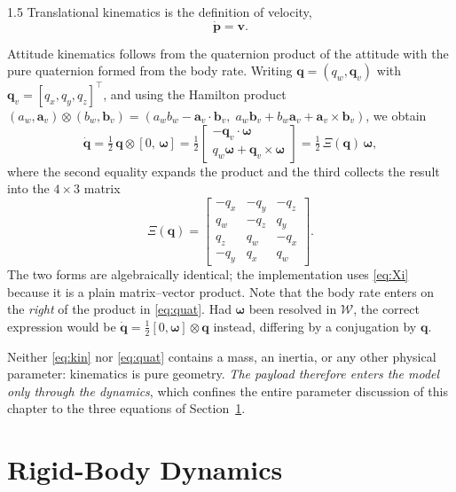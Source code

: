 \begin{spacing}{1.5}
Translational kinematics is the definition of velocity,
\begin{equation}
\dot{\bm{p}} = \bm{v}.
\label{eq:kin}
\end{equation}

Attitude kinematics follows from the quaternion product of the attitude
with the pure quaternion formed from the body rate. Writing
$\bm{q} = (q_w, \bm{q}_v)$ with $\bm{q}_v = [q_x, q_y, q_z]^{\!\top}$,
and using the Hamilton product
$(a_w, \bm{a}_v) \otimes (b_w, \bm{b}_v) =
(a_w b_w - \bm{a}_v \!\cdot\! \bm{b}_v,\;
a_w \bm{b}_v + b_w \bm{a}_v + \bm{a}_v \!\times\! \bm{b}_v)$,
we obtain
\begin{equation}
\dot{\bm{q}} = \tfrac{1}{2}\, \bm{q} \otimes [0,\, \bm{\omega}]
= \tfrac{1}{2}
\begin{bmatrix}
-\bm{q}_v \cdot \bm{\omega} \\[2pt]
q_w \bm{\omega} + \bm{q}_v \times \bm{\omega}
\end{bmatrix}
= \tfrac{1}{2}\, \Xi(\bm{q})\, \bm{\omega},
\label{eq:quat}
\end{equation}
where the second equality expands the product and the third collects the
result into the $4 \times 3$ matrix
\begin{equation}
\Xi(\bm{q}) =
\begin{bmatrix}
-q_x & -q_y & -q_z \\
 q_w & -q_z &  q_y \\
 q_z &  q_w & -q_x \\
-q_y &  q_x &  q_w
\end{bmatrix}.
\label{eq:Xi}
\end{equation}
The two forms are algebraically identical; the implementation uses
\eqref{eq:Xi} because it is a plain matrix--vector product. Note that the
body rate enters on the \emph{right} of the product in \eqref{eq:quat}.
Had $\bm{\omega}$ been resolved in $\mathcal{W}$, the correct expression
would be $\dot{\bm{q}} = \tfrac{1}{2} [0, \bm{\omega}] \otimes \bm{q}$
instead, differing by a conjugation by $\bm{q}$.

Neither \eqref{eq:kin} nor \eqref{eq:quat} contains a mass, an inertia, or
any other physical parameter: kinematics is pure geometry. \emph{The
payload therefore enters the model only through the dynamics}, which
confines the entire parameter discussion of this chapter to the three
equations of Section~\ref{sec:model:dyn}.

\section{Rigid-Body Dynamics}\label{sec:model:dyn}


\end{spacing}
